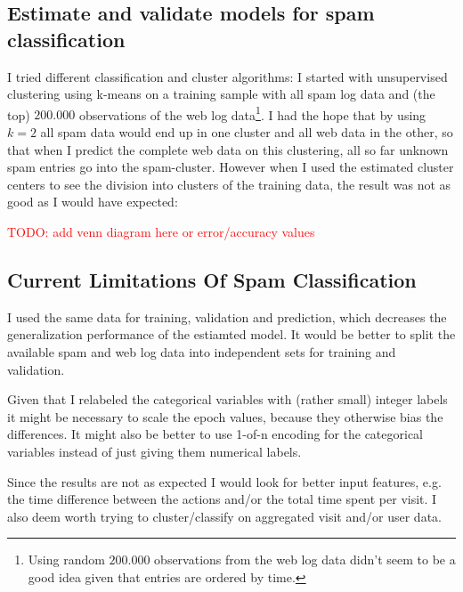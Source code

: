 \documentclass{article}\usepackage[]{graphicx}\usepackage[]{color}
\begin{document}
\subsection{Estimate and validate models for spam classification} %
\label{sub:estimate_and_validate_models_for_spam_classification}
I tried different classification and cluster algorithms: I started with unsupervised clustering using k-means on a training sample with all spam log data and (the top) $200.000$ observations of the web log data\footnote{Using random $200.000$ observations from the web log data didn't seem to be a good idea given that entries are ordered by time.}. I had the hope that by using $k=2$ all spam data would end up in one cluster and all web data in the other, so that when I predict the complete web data on this clustering, all so far unknown spam entries go into the spam-cluster. However when I used the estimated cluster centers to see the division into clusters of the training data, the result was not as good as I would have expected:

\textcolor{red}{TODO: add venn diagram here or error/accuracy values}


\subsection{Current Limitations Of Spam Classification} %
\label{sub:current_limitations}

I used the same data for training, validation and prediction, which decreases the generalization performance of the estiamted model. It would be better to split the available spam and web log data into independent sets for training and validation.

Given that I relabeled the categorical variables with (rather small) integer labels it might be necessary to scale the epoch values, because they otherwise bias the differences. It might also be better to use 1-of-n encoding for the categorical variables instead of just giving them numerical labels.


Since the results are not as expected I would look for better input features, e.g. the time difference between the actions and/or the total time spent per visit. I also deem worth trying to cluster/classify on aggregated visit and/or user data. %
\end{document}
